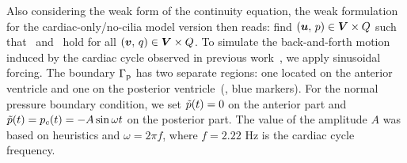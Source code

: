 \documentclass{WileyMSP-template}
\begin{document}
Also considering the weak form of the continuity equation,
the weak formulation for the cardiac-only/no-cilia model version
then reads: find $(\bm{u},\, p)\in\bm{V}\times Q$
such that~ and~
hold for all $(\bm{v}, \, q)\in\bm{V}\times Q$.
To simulate the back-and-forth motion induced by the cardiac cycle observed in
previous work~\cite{Olstad2019CiliaryDevelopment}, we apply sinusoidal forcing.
The boundary $\Gamma_{\mathrm{p}}$ has two separate regions: one located on the
anterior ventricle and one on the posterior ventricle~(, blue markers).
For the normal pressure boundary condition, we set $\Tilde{p}(t) = 0$ on the anterior part and
$\Tilde{p}(t) = p_c(t) = -A\sin{\omega t}$ on the posterior part. The value of the amplitude
$A$ was based on heuristics and $\omega = 2\pi f$, where $f=2.22$ Hz
is the cardiac cycle frequency. 
\end{document}
